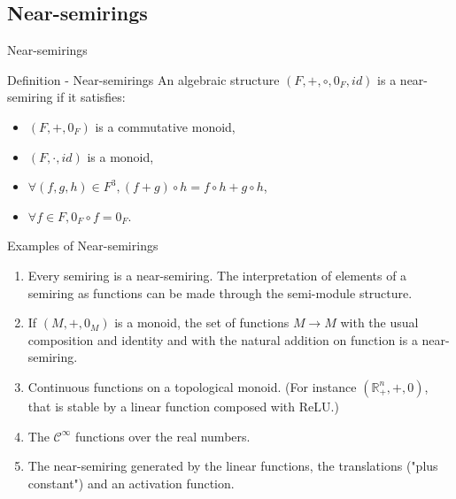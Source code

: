 \documentclass[11pt]{beamer}
\begin{document}
\subsection{Near-semirings}
\begin{frame}{Near-semirings}

\begin{block}{Definition - Near-semirings}
An algebraic structure $(F,+,\circ,0_F,id)$ is a near-semiring if it satisfies:
	\begin{itemize}

	\item $(F,+,0_F)$ is a commutative monoid,
	
	\item $(F,\cdot,id)$ is a monoid,
	
	\item $\forall (f,g,h) \in F^3, (f+g)\circ h = f \circ h + g \circ h$,
	
	\item $\forall f \in F, 0_F \circ f = 0_F$.

	\end{itemize}
\end{block}
\end{frame}

\begin{frame}{Examples of Near-semirings}

\begin{enumerate}

	\item Every semiring is a near-semiring. The interpretation of elements of a semiring as functions can be made through the semi-module structure.
	
	\item If $(M,+,0_M)$ is a monoid, the set of functions $M \to M$ with the usual composition and identity and with the natural addition on function is a near-semiring.
	
	\item Continuous functions on a topological monoid. (For instance $(\mathbb{R}_+^n,+,0)$, that is stable by a linear function composed with ReLU.)

	\item The $\mathcal{C}^\infty$ functions over the real numbers.
		
	\item The near-semiring generated by the linear functions, the translations ("plus constant") and an activation function.
	
\end{enumerate}

\end{frame}
\end{document}
